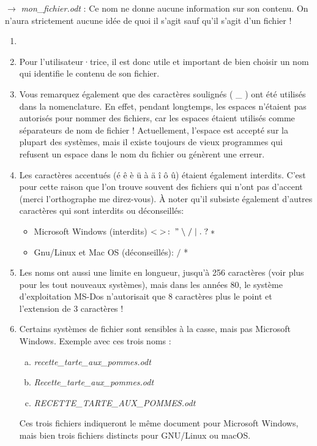 \documentclass[11pt, a4paper]{book}
\begin{document}
$\rightarrow$ {\it mon\_fichier.odt} : Ce nom ne donne aucune information sur son contenu. On n’aura strictement aucune idée de quoi il s’agit sauf qu’il s’agit d’un fichier !
\begin{remarques}
\begin{enumerate}
\item[]
\item Pour l’utilisateur·trice, il est donc utile et important de bien choisir un nom qui identifie le contenu de son fichier.
\item Vous remarquez également que des caractères soulignés ( \_ ) ont été utilisés dans la nomenclature. En effet, pendant longtemps, les espaces n’étaient pas autorisés pour nommer des fichiers, car les espaces étaient utilisés comme séparateurs de nom de fichier ! Actuellement, l’espace est accepté sur la plupart des systèmes, mais il existe toujours de vieux programmes qui refusent un espace dans le nom du fichier ou génèrent une erreur.
\item Les caractères accentués (é ê è ü à ä î ô û) étaient également interdits. C’est pour cette raison que l’on trouve souvent des fichiers qui n’ont pas d’accent (merci l’orthographe me direz-vous). À noter qu’il subsiste également d’autres caractères qui sont interdits ou déconseillés:
\begin{itemize}
\item Microsoft Windows (interdits) $< \; >  \,  :  \;   " \;   \backslash \;  / \; \vert \; . \; ? \; *$ 
\item Gnu/Linux et Mac OS (déconseillés): $/$ * 
\end{itemize}
\item Les noms ont aussi une limite en longueur, jusqu’à 256 caractères (voir plus pour les tout nouveaux systèmes), mais dans les années 80, le système d’exploitation MS-Dos n’autorisait que 8 caractères plus le point et l’extension de 3 caractères !
\item Certains systèmes de fichier sont sensibles à la casse, mais pas Microsoft Windows. Exemple avec ces trois noms :
\begin{enumerate}[a)]
\item {\it recette\_tarte\_aux\_pommes.odt}
\item {\it Recette\_tarte\_aux\_pommes.odt}
\item {\it RECETTE\_TARTE\_AUX\_POMMES.odt}
\end{enumerate}
Ces trois fichiers indiqueront le même document pour Microsoft Windows, mais bien trois fichiers distincts pour GNU/Linux ou macOS.
\end{enumerate}
\end{remarques}
\end{document}
